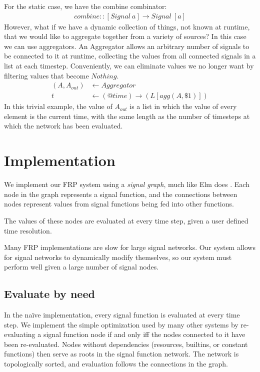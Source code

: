 \documentclass[twocolumn,11pt,english]{article}
\begin{document}
For the static case, we have the combine combinator: 
\begin{align*}
combine :: [Signal~a] \rightarrow Signal~[a]
\end{align*}
However, what if we have a dynamic collection of things, not known at runtime, that we would like to aggregate together from a variety of sources? In this case we can use aggregators. An Aggregator allows an arbitrary number of signals to be connected to it at runtime, collecting the values from all connected signals in a list at each timestep. Conveniently, we can eliminate values we no longer want by filtering values that become $Nothing$. 
\begin{align*}
(A, A_{out}) &\leftarrow Aggregator
\\t &\leftarrow (@time) \rightarrow (L[agg(A, \$1)])
\end{align*}
In this trivial example, the value of $A_{out}$ is a list in which the value of every element is the current time, with the same length as the number of timesteps at which the network has been evaluated. 

\section{Implementation}
We implement our FRP system using a \textit{signal graph}, much like Elm does \cite{czaplicki2013asynchronous}. Each node in the graph represents a signal function, and the connections between nodes represent values from signal functions being fed into other functions. 

The values of these nodes are evaluated at every time step, given a user defined time resolution. 

Many FRP implementations are slow for large signal networks. Our system allows for signal networks to dynamically modify themselves, so our system must perform well given a large number of signal nodes. 

\subsection{Evaluate by need}
In the na\"ive implementation, every signal function is evaluated at every time step. We implement the simple optimization used by many other systems \cite{hudak2003arrows} \cite{czaplicki2013asynchronous} by re-evaluating a signal function node if and only iff the nodes connected to it have been re-evaluated. Nodes without dependencies (resources, builtins, or constant functions) then serve as roots in the signal function network. The network is topologically sorted, and evaluation follows the connections in the graph. 
\end{document}
